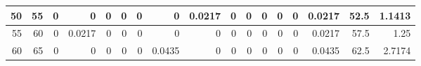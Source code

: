 \begin{table}[ht]
\begin{adjustbox}{width = \textwidth, center}
\begin{tabular}{|rr|r|r|r|r|r|r|r|r|r|r|r|r|r|r|r|}
            \cellcolor[HTML]{C8E4BE}50             & \cellcolor[HTML]{D9EAD3}55             & 0                                              & 0                                              & 0                                              & 0                                              & 0                                              & 0                                              & \cellcolor[HTML]{C7E9D8}0.0217                 & 0                                               & 0                                               & 0                                               & 0                                               & 0                                               & \cellcolor[HTML]{D9D2E9}0.0217                                                  & \cellcolor[HTML]{D9D2E9}52.5                                            & \cellcolor[HTML]{D9D2E9}1.1413                                                                   \\ \hline
            \rowcolor[HTML]{FFFFFF} 
            \cellcolor[HTML]{C8E4BE}55             & \cellcolor[HTML]{D9EAD3}60             & 0                                              & \cellcolor[HTML]{C7E9D8}0.0217                 & 0                                              & 0                                              & 0                                              & 0                                              & 0                                              & 0                                               & 0                                               & 0                                               & 0                                               & 0                                               & \cellcolor[HTML]{D9D2E9}0.0217                                                  & \cellcolor[HTML]{D9D2E9}57.5                                            & \cellcolor[HTML]{D9D2E9}1.25                                                                     \\ \hline
            \rowcolor[HTML]{FFFFFF} 
            \cellcolor[HTML]{C8E4BE}60             & \cellcolor[HTML]{D9EAD3}65             & 0                                              & 0                                              & 0                                              & 0                                              & 0                                              & \cellcolor[HTML]{8FD2B1}0.0435                 & 0                                              & 0                                               & 0                                               & 0                                               & 0                                               & 0                                               & \cellcolor[HTML]{D9D2E9}0.0435                                                  & \cellcolor[HTML]{D9D2E9}62.5                                            & \cellcolor[HTML]{D9D2E9}2.7174                                                                   \\ \hline

\end{tabular}
\end{adjustbox}
\end{table}
